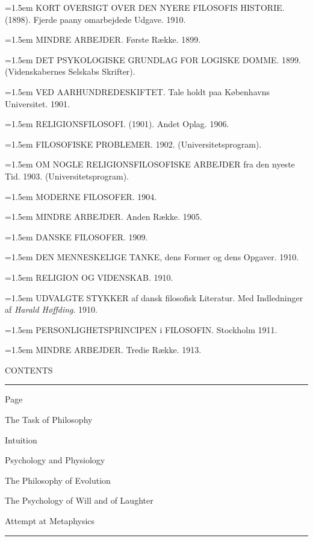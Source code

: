 \documentclass[12pt,a4paper,openany]{book}
\newcommand{\ix}[3]{\par\noindent\makebox[2em][l]{#1}#2\dotfill #3}
\begin{document}
\begin{footnotesize}
\hangindent=1.5em KORT OVERSIGT OVER DEN NYERE FILOSOFIS HISTORIE. (1898). Fjerde paany omarbejdede Udgave. 1910.\par
\hangindent=1.5em MINDRE ARBEJDER. Første Række. 1899.\par
\hangindent=1.5em DET PSYKOLOGISKE GRUNDLAG FOR LOGISKE DOMME. 1899. (Videnskabernes Selskabs Skrifter).\par
\hangindent=1.5em VED AARHUNDREDESKIFTET. Tale holdt paa Københavns Universitet. 1901.\par
\hangindent=1.5em RELIGIONSFILOSOFI. (1901). Andet Oplag. 1906.\par
\hangindent=1.5em FILOSOFISKE PROBLEMER. 1902. (Universitetsprogram).\par
\hangindent=1.5em OM NOGLE RELIGIONSFILOSOFISKE ARBEJDER fra den nyeste Tid. 1903. (Universitetsprogram).\par
\hangindent=1.5em MODERNE FILOSOFER. 1904.\par
\hangindent=1.5em MINDRE ARBEJDER. Anden Række. 1905.\par
\hangindent=1.5em DANSKE FILOSOFER. 1909.\par
\hangindent=1.5em DEN MENNESKELIGE TANKE, dens Former og dens Opgaver. 1910.\par
\hangindent=1.5em RELIGION OG VIDENSKAB. 1910.\par
\hangindent=1.5em UDVALGTE STYKKER af dansk filosofisk Literatur. Med Indledninger af \textit{Harald Høffding}. 1910.\par
\hangindent=1.5em PERSONLIGHETSPRINCIPEN i FILOSOFIN. Stockholm 1911.\par
\hangindent=1.5em MINDRE ARBEJDER. Tredie Række. 1913.\par
\end{footnotesize}
\clearpage

\begin{center}{\large CONTENTS}\\[4pt]\rule{1.2cm}{0.4pt}\end{center}
\medskip
\noindent\hfill{\small Page}
\ix{1.}{The Task of Philosophy}{1}
\ix{2.}{Intuition}{11}
\ix{3.}{Psychology and Physiology}{27}
\ix{4.}{The Philosophy of Evolution}{35}
\ix{5.}{The Psychology of Will and of Laughter}{43}
\ix{6.}{Attempt at Metaphysics}{52}
\par
\begin{center}\rule{2cm}{0.4pt}\end{center}
\clearpage
\end{document}
